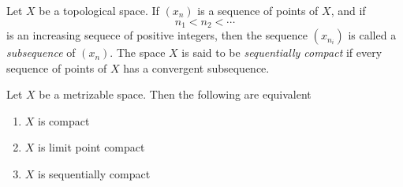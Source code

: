 \begin{definition}
    Let $X$ be a topological space. If $(x_n)$ is a sequence of points of $X$, and if 
    \begin{equation*}
        n_1 < n_2 < \cdots
    \end{equation*}
    is an increasing sequece of positive integers, then the sequence $(x_{n_i})$ is called a \textit{subsequence} of $(x_n)$. The space $X$ is said to be \textit{sequentially compact} if every sequence of points of $X$ has a convergent subsequence.
\end{definition}

\begin{theorem}
    Let $X$ be a metrizable space. Then the following are equivalent 
    \begin{enumerate}
        \item $X$ is compact
        \item $X$ is limit point compact
        \item $X$ is sequentially compact
    \end{enumerate}
\end{theorem}
